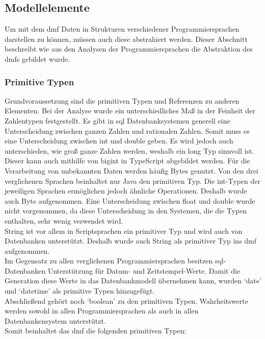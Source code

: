 \documentclass[./einleitung.tex]{subfiles}
\begin{document}
    \subsection{Modellelemente}\label{subsec:elemente-eines-modells}
    Um mit dem \acrshort{dmf} Daten in Strukturen verschiedener Programmiersprachen darstellen zu können, müssen auch diese abstrahiert werden.
    Dieser Abschnitt beschreibt wie aus den Analysen der Programmiersprachen die Abstraktion des \acrshort{dmf}s gebildet wurde.

    \subsubsection{Primitive Typen}
    Grundvoraussetzung sind die primitiven Typen und Referenzen zu anderen Elementen.
    Bei der Analyse wurde ein unterschiedliches Maß in der Feinheit der Zahlentypen festgestellt.
    Es gibt in \acrfull{sql} Datenbanksystemen generell eine Unterscheidung zwischen ganzen Zahlen und rationalen Zahlen.
    Somit muss es eine Unterscheidung zwischen int und double geben.
    Es wird jedoch auch unterschieden, wie groß ganze Zahlen werden, weshalb ein long Typ sinnvoll ist.
    Dieser kann auch mithilfe von bigint in TypeScript abgebildet werden.
    Für die Verarbeitung von unbekannten Daten werden häufig Bytes genutzt.
    Von den drei verglichenen Sprachen beinhaltet nur Java den primitiven Typ.
    Die int-Typen der jeweiligen Sprachen ermöglichen jedoch ähnliche Operationen.
    Deshalb wurde auch Byte aufgenommen.
    Eine Unterscheidung zwischen float und double wurde nicht vorgenommen, da diese Unterscheidung in den Systemen, die die Typen enthalten, sehr wenig verwendet wird.\\
    String ist vor allem in Scriptsprachen ein primitiver Typ und wird auch von Datenbanken unterstützt.
    Deshalb wurde auch String als primitiver Typ ins \acrshort{dmf} aufgenommen.\\
    Im Gegensatz zu allen verglichenen Programmiersprachen besitzen \acrshort{sql}-Datenbanken Unterstützung für Datum- und Zeitstempel-Werte.
    Damit die Generation diese Werte in das Datenbankmodell übernehmen kann, wurden `date' und `datetime' als primitive Typen hinzugefügt. \\
    Abschließend gehört noch `boolean' zu den primitiven Typen.
    Wahrheitswerte werden sowohl in allen Programmiersprachen als auch in allen Datenbankensystem unterstützt. \\

    Somit beinhaltet das \acrshort{dmf} die folgenden primitiven Typen:
\end{document}
